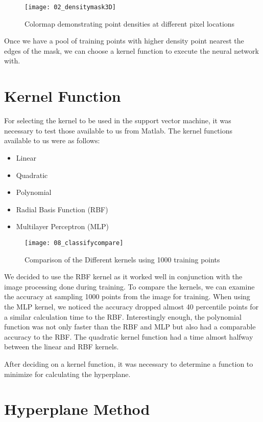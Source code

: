 \begin{figure}[ht]
    \centering
    \texttt{[image: 02\_densitymask3D]}
    \caption{Colormap demonstrating point densities at different pixel locations}
    \label{fig:02_densitymask3D}
\end{figure}

Once we have a pool of training points with higher density point nearest the edges of the mask, we can choose a kernel function to execute the neural network with.

\section{Kernel Function}

For selecting the kernel to be used in the support vector machine, it was necessary to test those available to us from Matlab. The kernel functions available to us were as follows:

\begin{itemize}
  \item Linear
  \item Quadratic
  \item Polynomial
  \item Radial Basis Function (RBF)
  \item Multilayer Perceptron (MLP)
\end{itemize}

\begin{figure}[ht]
    \centering
    \texttt{[image: 08\_classifycompare]}
    \caption{Comparison of the Different kernels using 1000 training points}
    \label{fig:08_classifycompare}
\end{figure}

We decided to use the RBF kernel as it worked well in conjunction with the image processing done during training. To compare the kernels, we can examine the accuracy at sampling 1000 points from the image for training. When using the MLP kernel, we noticed the accuracy dropped almost 40 percentile points for a similar calculation time to the RBF. Interestingly enough, the polynomial function was not only faster than the RBF and MLP but also had a comparable accuracy to the RBF. The quadratic kernel function had a time almost halfway between the linear and RBF kernels.

After deciding on a kernel function, it was necessary to determine a function to minimize for calculating the hyperplane.

\section{Hyperplane Method}

